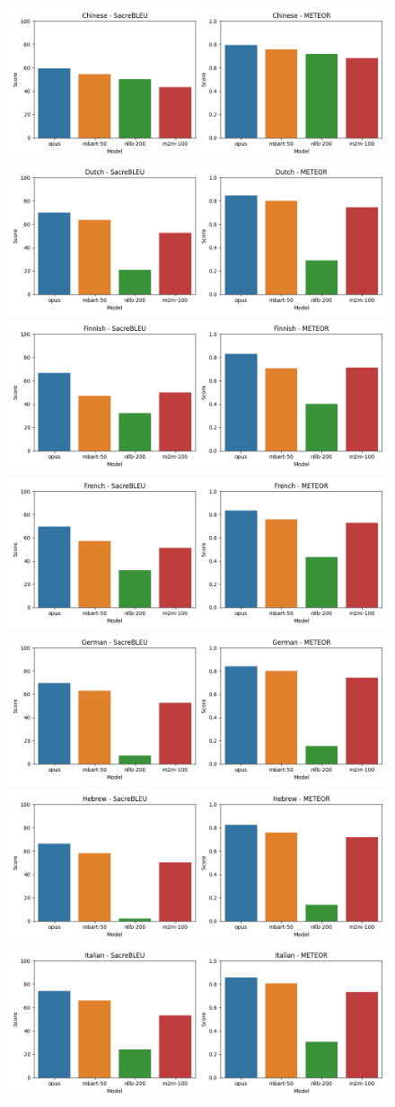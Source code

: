 \documentclass[a4paper]{article}
\begin{document}
\begin{figure}[htbp]
    \centering
    \includegraphics[width=0.49\linewidth]{figures/chinese_all_metrics.png}
    \includegraphics[width=0.49\linewidth]{figures/dutch_all_metrics.png}
    \includegraphics[width=0.49\linewidth]{figures/finnish_all_metrics.png}
    \includegraphics[width=0.49\linewidth]{figures/french_all_metrics.png}
    \includegraphics[width=0.49\linewidth]{figures/german_all_metrics.png}
    \includegraphics[width=0.49\linewidth]{figures/hebrew_all_metrics.png}
    \includegraphics[width=0.49\linewidth]{figures/italian_all_metrics.png}

\end{figure}
\end{document}
